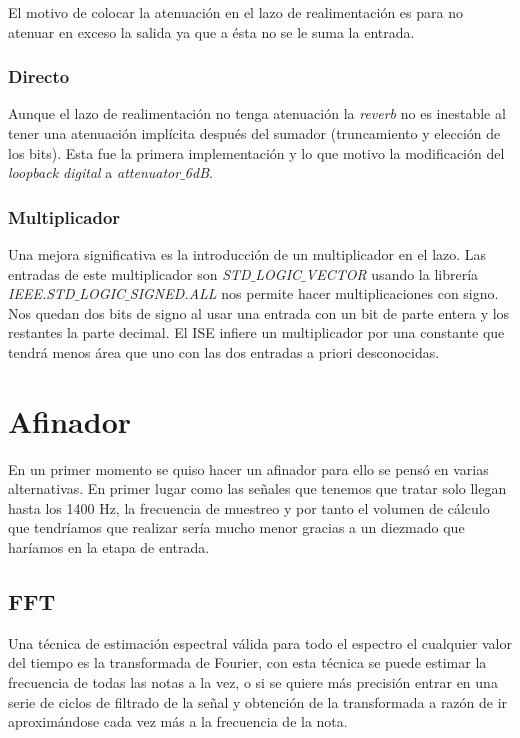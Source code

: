 		El motivo de colocar la atenuación en el lazo de realimentación es para no atenuar en exceso la salida ya que a ésta no se le suma la entrada. 

		\subsubsection{Directo} 
		Aunque el lazo de realimentación no tenga atenuación la \emph{reverb} no es inestable al tener una atenuación implícita después del sumador (truncamiento y elección de los bits). Esta fue la primera implementación y lo que motivo la modificación del \emph{loopback digital} a \emph{attenuator$\_$6dB}.
		
		\subsubsection{Multiplicador}
		Una mejora significativa es la introducción de un multiplicador en el lazo. Las entradas de este multiplicador son \emph{STD$\_$LOGIC$\_$VECTOR} usando la librería \emph{IEEE.STD$\_$LOGIC$\_$SIGNED.ALL} nos permite hacer multiplicaciones con signo. Nos quedan dos bits de signo al usar una entrada con un bit de parte entera y los restantes la parte decimal. El ISE infiere un multiplicador por una constante que tendrá menos área que uno con las dos entradas a priori desconocidas.



\section{Afinador}
	En un primer momento se quiso hacer un afinador para ello se pensó en varias alternativas. En primer lugar como las señales que tenemos que tratar solo llegan hasta los 1400 Hz, la frecuencia de muestreo y por tanto el volumen de cálculo que tendríamos que realizar sería mucho menor gracias a un diezmado que haríamos en la etapa de entrada.
	
	\subsection{FFT}
	Una técnica de estimación espectral válida para todo el espectro el cualquier valor del tiempo es la transformada de Fourier, con esta técnica se puede estimar la frecuencia de todas las notas a la vez, o si se quiere más precisión entrar en una serie de ciclos de filtrado de la señal y obtención de la transformada a razón de ir aproximándose cada vez más a la frecuencia de la nota. 
	
